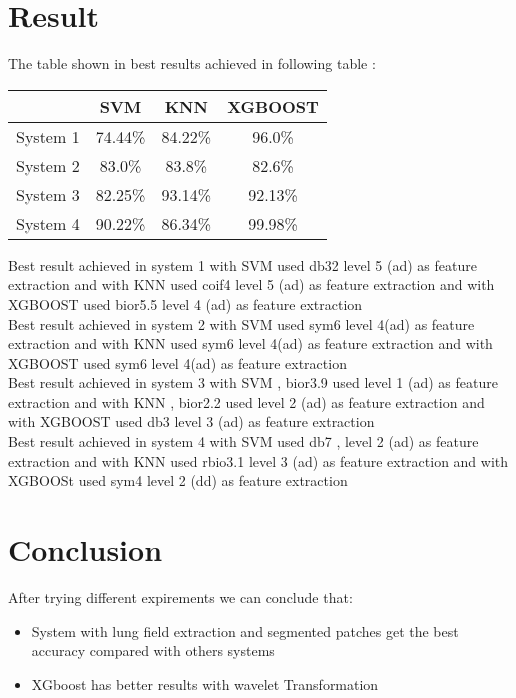 \documentclass[hidelinks,12pt,xcolor=table]{article}
\begin{document}
\begin{multicols}{2}
\section{Result}
The table shown in best results achieved in following table :\\

\begin{center}
\centering
\label{my-label}
\begin{tabular}{|c|c|c|c|}
\hline & SVM & KNN & XGBOOST                        \\ \hline
System 1 & 74.44\% & 84.22\% & {\color[HTML]{FE0000} 96.0\%}  \\ \hline
System 2 & 83.0\%  & {\color[HTML]{FE0000} 83.8\%}  & 82.6\%                         \\ \hline
System 3 & 82.25\% & {\color[HTML]{FE0000} 93.14\%} & 92.13\%                        \\ \hline
System 4 & 90.22\% & 86.34\% & {\color[HTML]{FE0000} 99.98\%} \\ \hline
\end{tabular}
\end{center}

 Best result achieved in system 1  with SVM used db32 level 5 (ad) as feature extraction
and with KNN used coif4 level 5 (ad) as feature extraction
and with XGBOOST used bior5.5 level 4 (ad) as feature extraction\\

 Best result achieved in  system 2 with SVM used sym6 level 4(ad) as feature extraction
and with KNN used sym6 level 4(ad) as feature extraction
and with XGBOOST used sym6 level 4(ad) as feature extraction\\

 Best result achieved in  system 3 with SVM , bior3.9 used level 1 (ad) as feature extraction
and with KNN , bior2.2 used level 2 (ad) as feature extraction
and with XGBOOST used db3  level 3 (ad) as feature extraction\\

 Best result achieved in  system 4 with SVM used db7 , level 2 (ad) as feature extraction
and with KNN used rbio3.1  level 3 (ad) as feature extraction
and with XGBOOSt used sym4  level 2 (dd) as feature extraction\\

\section{Conclusion}
After trying different expirements we can conclude that:\\
\begin{itemize}
\item System with lung field extraction and segmented patches get the best accuracy compared with others systems\\
\item XGboost has better results with wavelet Transformation\\
\end{itemize}


\end{multicols}
\end{document}
